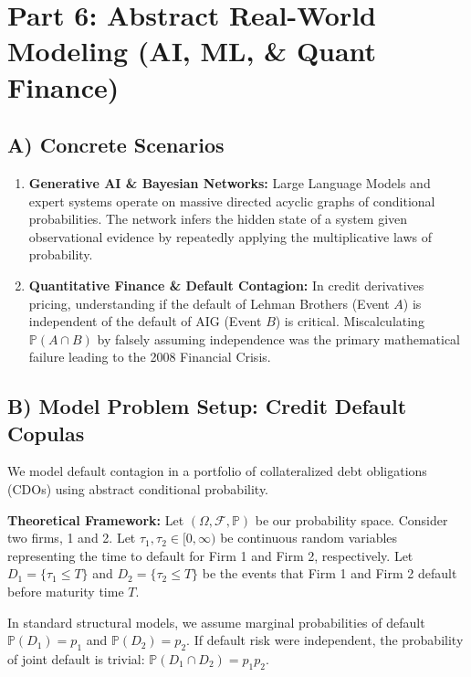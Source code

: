 \documentclass[12pt]{article}
\theoremstyle{definition}
\theoremstyle{remark}
\begin{document}
\section{Part 6: Abstract Real-World Modeling (AI, ML, \& Quant Finance)}

\subsection{A) Concrete Scenarios}
\begin{enumerate}
    \item \textbf{Generative AI \& Bayesian Networks:} Large Language Models and expert systems operate on massive directed acyclic graphs of conditional probabilities. The network infers the hidden state of a system given observational evidence by repeatedly applying the multiplicative laws of probability.
    \item \textbf{Quantitative Finance \& Default Contagion:} In credit derivatives pricing, understanding if the default of Lehman Brothers (Event $A$) is independent of the default of AIG (Event $B$) is critical. Miscalculating $\mathbb{P}(A \cap B)$ by falsely assuming independence was the primary mathematical failure leading to the 2008 Financial Crisis.
\end{enumerate}

\subsection{B) Model Problem Setup: Credit Default Copulas}
We model default contagion in a portfolio of collateralized debt obligations (CDOs) using abstract conditional probability. 
\vspace{0.5em}

\textbf{Theoretical Framework:}
Let $(\Omega, \mathcal{F}, \mathbb{P})$ be our probability space. Consider two firms, 1 and 2. 
Let $\tau_1, \tau_2 \in [0, \infty)$ be continuous random variables representing the time to default for Firm 1 and Firm 2, respectively.
Let $D_1 = \{ \tau_1 \le T \}$ and $D_2 = \{ \tau_2 \le T \}$ be the events that Firm 1 and Firm 2 default before maturity time $T$.

In standard structural models, we assume marginal probabilities of default $\mathbb{P}(D_1) = p_1$ and $\mathbb{P}(D_2) = p_2$. If default risk were independent, the probability of joint default is trivial: $\mathbb{P}(D_1 \cap D_2) = p_1 p_2$. 
\end{document}
